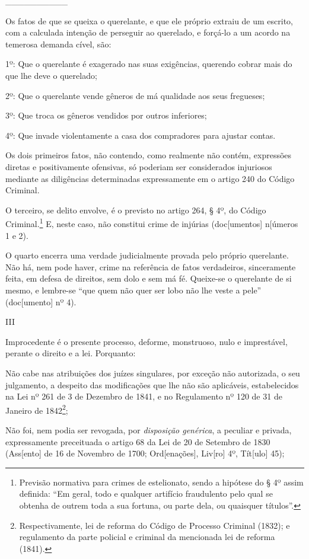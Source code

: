 \_\_\_\_\_\_\_\_\_\_

Os fatos de que se queixa o querelante, e que ele próprio extraiu de um
escrito, com a calculada intenção de perseguir ao querelado, e forçá-lo
a um acordo na temerosa demanda cível, são:

1º: Que o querelante é exagerado nas suas exigências, querendo cobrar
mais do que lhe deve o querelado;

2º: Que o querelante vende gêneros de má qualidade aos seus fregueses;

3º: Que troca os gêneros vendidos por outros inferiores;

4º: Que invade violentamente a casa dos compradores para ajustar contas.

Os dois primeiros fatos, não contendo, como realmente não contém,
expressões diretas e positivamente ofensivas, só poderiam ser
considerados injuriosos mediante as diligências determinadas
expressamente em o artigo 240 do Código Criminal.

O terceiro, se delito envolve, é o previsto no artigo 264, § 4º, do
Código Criminal.\footnote{Previsão normativa para crimes de estelionato,
  sendo a hipótese do § 4º assim definida: ``Em geral, todo e qualquer
  artifício fraudulento pelo qual se obtenha de outrem toda a sua
  fortuna, ou parte dela, ou quaisquer títulos''.} E, neste caso, não
constitui crime de injúrias (doc{[}umentos{]} n{[}úmeros 1 e 2).

O quarto encerra uma verdade judicialmente provada pelo próprio
querelante. Não há, nem pode haver, crime na referência de fatos
verdadeiros, sinceramente feita, em defesa de direitos, sem dolo e sem
má fé. Queixe-se o querelante de si mesmo, e lembre-se ``que quem não
quer ser lobo não lhe veste a pele'' (doc{[}umento{]} nº 4).

III

Improcedente é o presente processo, deforme, monstruoso, nulo e
imprestável, perante o direito e a lei. Porquanto:

Não cabe nas atribuições dos juízes singulares, por exceção não
autorizada, o seu julgamento, a despeito das modificações que lhe não
são aplicáveis, estabelecidos na Lei nº 261 de 3 de Dezembro de 1841, e
no Regulamento nº 120 de 31 de Janeiro de 1842\footnote{Respectivamente,
  lei de reforma do Código de Processo Criminal (1832); e regulamento da
  parte policial e criminal da mencionada lei de reforma (1841).};

Não foi, nem podia ser revogada, por \emph{disposição genérica}, a
peculiar e privada, expressamente preceituada o artigo 68 da Lei de 20
de Setembro de 1830 (Ass{[}ento{]} de 16 de Novembro de 1700;
Ord{[}enações{]}, Liv{[}ro{]} 4º, Tít{[}ulo{]} 45);


